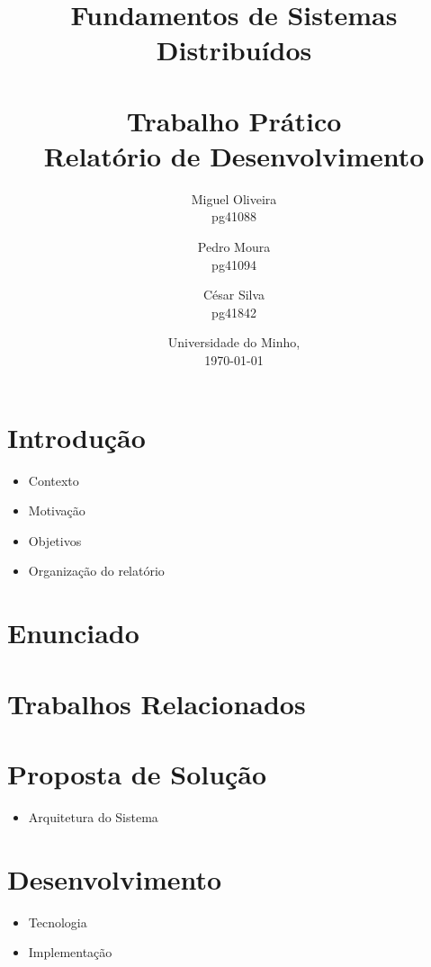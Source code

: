 \documentclass[12pt, a4paper]{report}
\begin{document}
\title{
    Fundamentos de Sistemas Distribuídos\\
    \textbf{\\Trabalho Prático}
    \large{\\Relatório de Desenvolvimento}
}

\author{
    Miguel Oliveira\\ pg41088
    \and Pedro Moura\\ pg41094
    \and César Silva\\ pg41842
}
\date{Universidade do Minho,\\\today}

\maketitle


\tableofcontents


\chapter{Introdução}
\begin{itemize}
    \item Contexto
    \item Motivação
    \item Objetivos
    \item Organização do relatório
\end{itemize}


\chapter{Enunciado}


\chapter{Trabalhos Relacionados}


\chapter{Proposta de Solução}
\begin{itemize}
    \item Arquitetura do Sistema
\end{itemize}


\chapter{Desenvolvimento}
\begin{itemize}
    \item Tecnologia
    \item Implementação
\end{itemize}
\end{document}
